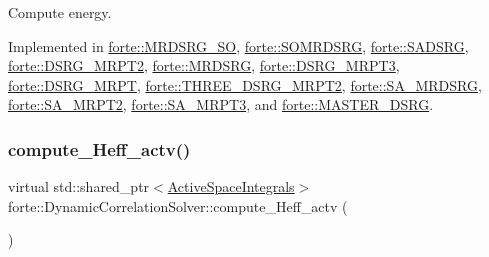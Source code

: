Compute energy. 



Implemented in \mbox{\hyperlink{classforte_1_1_m_r_d_s_r_g___s_o_a5a73a7377c4a2be6ce0d875f9833d589}{forte\+::\+M\+R\+D\+S\+R\+G\+\_\+\+SO}}, \mbox{\hyperlink{classforte_1_1_s_o_m_r_d_s_r_g_a80e229a7a41f301ebab0b8d063f8e243}{forte\+::\+S\+O\+M\+R\+D\+S\+RG}}, \mbox{\hyperlink{classforte_1_1_s_a_d_s_r_g_aa3716848c396b296b99fff8d48751fd8}{forte\+::\+S\+A\+D\+S\+RG}}, \mbox{\hyperlink{classforte_1_1_d_s_r_g___m_r_p_t2_a0884f1a9e8f98eb3c272e9c6518e7691}{forte\+::\+D\+S\+R\+G\+\_\+\+M\+R\+P\+T2}}, \mbox{\hyperlink{classforte_1_1_m_r_d_s_r_g_a6c9a82cec6600ecbf3b2a0b01d946223}{forte\+::\+M\+R\+D\+S\+RG}}, \mbox{\hyperlink{classforte_1_1_d_s_r_g___m_r_p_t3_a48a25a952206690bcf8125e583576052}{forte\+::\+D\+S\+R\+G\+\_\+\+M\+R\+P\+T3}}, \mbox{\hyperlink{classforte_1_1_d_s_r_g___m_r_p_t_a83b7f20d255a4f1f33bb05d707846f85}{forte\+::\+D\+S\+R\+G\+\_\+\+M\+R\+PT}}, \mbox{\hyperlink{classforte_1_1_t_h_r_e_e___d_s_r_g___m_r_p_t2_af7cee9b490ef09652f35cbfd48f8fe6a}{forte\+::\+T\+H\+R\+E\+E\+\_\+\+D\+S\+R\+G\+\_\+\+M\+R\+P\+T2}}, \mbox{\hyperlink{classforte_1_1_s_a___m_r_d_s_r_g_a9c86de209cdf7a12ed9cb99e9570fff5}{forte\+::\+S\+A\+\_\+\+M\+R\+D\+S\+RG}}, \mbox{\hyperlink{classforte_1_1_s_a___m_r_p_t2_ac9a4af8ba06295c2918dbc2640caab85}{forte\+::\+S\+A\+\_\+\+M\+R\+P\+T2}}, \mbox{\hyperlink{classforte_1_1_s_a___m_r_p_t3_a566a1aa6f6d3cbb8acdac40cba928aaf}{forte\+::\+S\+A\+\_\+\+M\+R\+P\+T3}}, and \mbox{\hyperlink{classforte_1_1_m_a_s_t_e_r___d_s_r_g_a34011aaadcc79224071a4266a095591b}{forte\+::\+M\+A\+S\+T\+E\+R\+\_\+\+D\+S\+RG}}.

\mbox{\label{classforte_1_1_dynamic_correlation_solver_a8a66ab912dd2c7c1d35c1428df5a494d}} 
\subsubsection{\texorpdfstring{compute\+\_\+\+Heff\+\_\+actv()}{compute\_Heff\_actv()}}
{\footnotesize\ttfamily virtual std\+::shared\+\_\+ptr$<$\mbox{\hyperlink{classforte_1_1_active_space_integrals}{Active\+Space\+Integrals}}$>$ forte\+::\+Dynamic\+Correlation\+Solver\+::compute\+\_\+\+Heff\+\_\+actv (\begin{DoxyParamCaption}{ }\end{DoxyParamCaption})\hspace{0.3cm}{\ttfamily [pure virtual]}}



